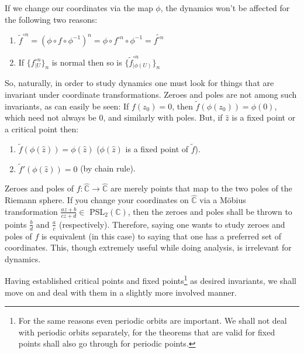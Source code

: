\documentclass[11pt,a4paper]{article}
\begin{document}

        If we change our coordinates via the map $\phi$, the dynamics won't be affected for the following two reasons:
        \begin{enumerate}
            \item $\tilde{f}^{\circ n} = (\phi \circ f \circ \phi^{-1})^n = \phi \circ f^{\circ n} \circ \phi^{-1} = \widetilde{f^{\circ n}}$
            \item If $\{f^{\circ n}_{\big|U}\}_n$ is normal then so is $\{\tilde{f}^{\circ n}_{\big|\phi(U)}\}_n$
        \end{enumerate}

        So, naturally, in order to study dynamics one must look for things that are invariant under coordinate transformations. Zeroes and poles are not among such invariants, as can easily be seen: If $f(z_0) = 0$, then $\tilde{f}(\phi(z_0)) = \phi(0)$, which need not always be $0$, and similarly with poles. But, if $\hat{z}$ is a fixed point or a critical point then:
        \begin{enumerate}
            \item $\tilde{f}(\phi(\hat{z})) = \phi(\hat{z})$ ($\phi(\hat{z})$ is a fixed point of $\tilde{f}$).
            \item $\tilde{f}'(\phi(\hat{z})) = 0$ (by chain rule).
        \end{enumerate}


        Zeroes and poles of $f: \hat{\mathbb{C}} \rightarrow \hat{\mathbb{C}}$ are merely points that map to the two poles of the Riemann sphere. If you change your coordinates on $\hat{\mathbb{C}}$ via a M\"obius transformation $\frac{az +b}{cz +d} \in$ PSL$_2(\mathbb{C})$, then the zeroes and poles shall be thrown to points $\frac{b}{d}$ and $\frac{a}{c}$ (respectively). Therefore, saying one wants to study zeroes and poles of $f$ is equivalent (in this case) to saying that one has a preferred set of coordinates. This, though extremely useful while doing analysis, is irrelevant for dynamics.

        Having established critical points and fixed points\footnote{For the same reasons even periodic orbits are important. We shall not deal with periodic orbits separately, for the theorems that are valid for fixed points shall also go through for periodic points.} as desired invariants, we shall move on and deal with them in a slightly more involved manner.
\end{document}
